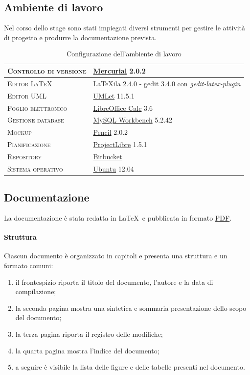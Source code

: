 \subsection{Ambiente di lavoro}
Nel corso dello stage sono stati impiegati diversi strumenti per gestire le attività di progetto e produrre la documentazione prevista.

\begin{table}[ht]
\centering
\begin{tabular}{|l|l|}
\hline
\textsc{Controllo di versione} & \underline{Mercurial} 2.0.2 \\ \hline
\textsc{Editor \LaTeX} & \underline{LaTeXila} 2.4.0 - \underline{gedit} 3.4.0 con \textit{gedit-latex-plugin} \\ \hline
\textsc{Editor UML} & \underline{UMLet} 11.5.1 \\ \hline
\textsc{Foglio elettronico} & \underline{LibreOffice Calc} 3.6 \\ \hline
\textsc{Gestione database} & \underline{MySQL Workbench} 5.2.42 \\ \hline
\textsc{Mockup} & \underline{Pencil} 2.0.2 \\	\hline
\textsc{Pianificazione} & \underline{ProjectLibre} 1.5.1 \\ \hline
\textsc{Repository} & \underline{Bitbucket} \\ \hline
\textsc{Sistema operativo} & \underline{Ubuntu} 12.04 \\ \hline
\end{tabular}
\caption{Configurazione dell'ambiente di lavoro}
\label{tab:tesi:stage:norme:strumenti}
\end{table}

\subsection{Documentazione}
La documentazione è stata redatta in \LaTeX\ e pubblicata in formato \underline{PDF}.

\paragraph{Struttura}
Ciascun documento è organizzato in capitoli e presenta una struttura e un formato comuni:
\begin{enumerate}
\item il frontespizio riporta il titolo del documento, l'autore e la data di compilazione;
\item la seconda pagina mostra una sintetica e sommaria presentazione dello scopo del documento;
\item la terza pagina riporta il registro delle modifiche;
\item la quarta pagina mostra l'indice del documento;
\item a seguire è visibile la lista delle figure e delle tabelle presenti nel documento.
\end{enumerate}

